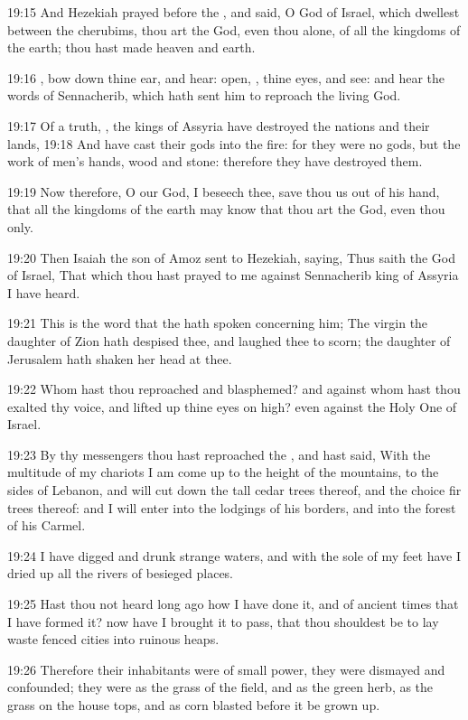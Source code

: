 19:15 And Hezekiah prayed before the \LORD, and said, O \LORD God of
Israel, which dwellest between the cherubims, thou art the God, even
thou alone, of all the kingdoms of the earth; thou hast made heaven
and earth.

19:16 \LORD, bow down thine ear, and hear: open, \LORD, thine eyes, and
see: and hear the words of Sennacherib, which hath sent him to
reproach the living God.

19:17 Of a truth, \LORD, the kings of Assyria have destroyed the
nations and their lands, 19:18 And have cast their gods into the fire:
for they were no gods, but the work of men's hands, wood and stone:
therefore they have destroyed them.

19:19 Now therefore, O \LORD our God, I beseech thee, save thou us out
of his hand, that all the kingdoms of the earth may know that thou art
the \LORD God, even thou only.

19:20 Then Isaiah the son of Amoz sent to Hezekiah, saying, Thus saith
the \LORD God of Israel, That which thou hast prayed to me against
Sennacherib king of Assyria I have heard.

19:21 This is the word that the \LORD hath spoken concerning him; The
virgin the daughter of Zion hath despised thee, and laughed thee to
scorn; the daughter of Jerusalem hath shaken her head at thee.

19:22 Whom hast thou reproached and blasphemed? and against whom hast
thou exalted thy voice, and lifted up thine eyes on high? even against
the Holy One of Israel.

19:23 By thy messengers thou hast reproached the \LORD, and hast said,
With the multitude of my chariots I am come up to the height of the
mountains, to the sides of Lebanon, and will cut down the tall cedar
trees thereof, and the choice fir trees thereof: and I will enter into
the lodgings of his borders, and into the forest of his Carmel.

19:24 I have digged and drunk strange waters, and with the sole of my
feet have I dried up all the rivers of besieged places.

19:25 Hast thou not heard long ago how I have done it, and of ancient
times that I have formed it? now have I brought it to pass, that thou
shouldest be to lay waste fenced cities into ruinous heaps.

19:26 Therefore their inhabitants were of small power, they were
dismayed and confounded; they were as the grass of the field, and as
the green herb, as the grass on the house tops, and as corn blasted
before it be grown up.

